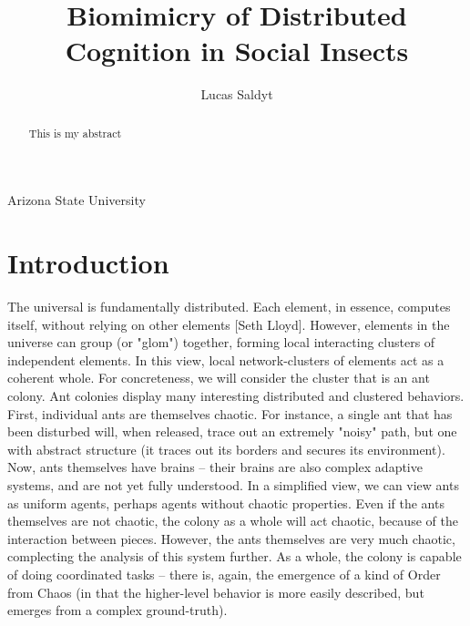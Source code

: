 \documentclass{nature}
\title{Biomimicry of Distributed Cognition in Social Insects}
\author{Lucas Saldyt}
\begin{document}
\maketitle

\begin{affiliations}
 \item Arizona State University
\end{affiliations}

\begin{abstract}
    This is my abstract
\end{abstract}

\section{Introduction}

The universal is fundamentally distributed.
Each element, in essence, computes itself, without relying on other elements [Seth Lloyd].
However, elements in the universe can group (or "glom") together, forming local interacting clusters of independent elements.
In this view, local network-clusters of elements act as a coherent whole.
For concreteness, we will consider the cluster that is an ant colony. 
Ant colonies display many interesting distributed and clustered behaviors.
First, individual ants are themselves chaotic. 
For instance, a single ant that has been disturbed will, when released, trace out an extremely "noisy" path, but one with abstract structure (it traces out its borders and secures its environment).
Now, ants themselves have brains -- their brains are also complex adaptive systems, and are not yet fully understood. 
In a simplified view, we can view ants as uniform agents, perhaps agents without chaotic properties.
Even if the ants themselves are not chaotic, the colony as a whole will act chaotic, because of the interaction between pieces.
However, the ants themselves are very much chaotic, complecting the analysis of this system further.
As a whole, the colony is capable of doing coordinated tasks -- there is, again, the emergence of a kind of Order from Chaos (in that the higher-level behavior is more easily described, but emerges from a complex ground-truth). 
\end{document}
